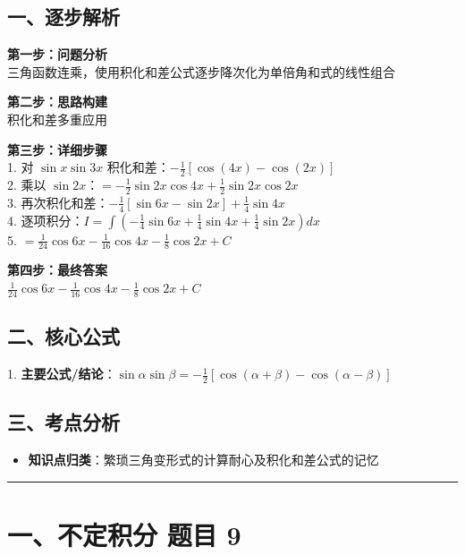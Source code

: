 ﻿\documentclass[12pt, a4paper]{ctexart}
\newcommand{\TopSeparator}{
    \par\noindent\rule{\textwidth}{1.5pt}\vspace{0.5em}
}
\newenvironment{RedAnalysis}{
    \par
    \color{red} 
}{
    \par
    \color{black} 
}
\begin{document}
\begin{RedAnalysis}

	\subsection*{一、逐步解析}

	\textbf{第一步：问题分析} \\
	三角函数连乘，使用积化和差公式逐步降次化为单倍角和式的线性组合

	\textbf{第二步：思路构建} \\
	积化和差多重应用

	\textbf{第三步：详细步骤} \\
	1. 对 $\sin x \sin 3x$ 积化和差：$-\frac{1}{2} [\cos(4x) - \cos(2x)]$ \\ 
	2. 乘以 $\sin 2x$：$= -\frac{1}{2} \sin 2x \cos 4x + \frac{1}{2} \sin 2x \cos 2x$ \\ 
	3. 再次积化和差：$-\frac{1}{4}[\sin 6x - \sin 2x] + \frac{1}{4}\sin 4x$ \\ 
	4. 逐项积分：$I = \int (-\frac{1}{4}\sin 6x + \frac{1}{4}\sin 4x + \frac{1}{4}\sin 2x) dx$ \\ 
	5. $ = \frac{1}{24}\cos 6x - \frac{1}{16}\cos 4x - \frac{1}{8}\cos 2x + C$

	\textbf{第四步：最终答案} \\
	$\frac{1}{24}\cos 6x - \frac{1}{16}\cos 4x - \frac{1}{8}\cos 2x + C$

	\subsection*{二、核心公式}
	1. \textbf{主要公式/结论}：$\sin\alpha\sin\beta = -\frac{1}{2}[\cos(\alpha+\beta)-\cos(\alpha-\beta)]$

	\subsection*{三、考点分析}
	\begin{itemize}
		\item \textbf{知识点归类}：繁琐三角变形式的计算耐心及积化和差公式的记忆
	\end{itemize}

\end{RedAnalysis}

\vspace{2em}

\TopSeparator
\section*{一、不定积分 题目 9}
\end{document}
